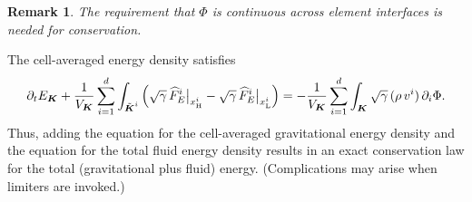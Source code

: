 \documentclass[10pt,preprint]{aastex}
\newtheorem*{remark}{Remark}
\begin{document}
\begin{remark}
  The requirement that $\Phi$ is continuous across element interfaces is needed for conservation.
\end{remark}

The cell-averaged energy density satisfies
\begin{equation}
  \pd{E_{\bK}}{t}
  +\f{1}{V_{\bK}}\sum_{i=1}^{d}\int_{\tilde{\bK}^{i}}
  \Big(
    \sqrt{\gamma}\,\widehat{F}_{E}^{i}\big|_{x_{\Hgh}^{i}}
    -\sqrt{\gamma}\,\widehat{F}_{E}^{i}\big|_{x_{\Low}^{i}}
  \Big)
  =-\f{1}{V_{\bK}}\sum_{i=1}^{d}\int_{\bK}\sqrt{\gamma}\,(\rho\,v^{i})\,\pd{\Phi}{i}.  
\end{equation}
Thus, adding the equation for the cell-averaged gravitational energy density and the equation for the total fluid energy density results in an exact conservation law for the total (gravitational plus fluid) energy.  
(Complications may arise when limiters are invoked.)  



\end{document}
